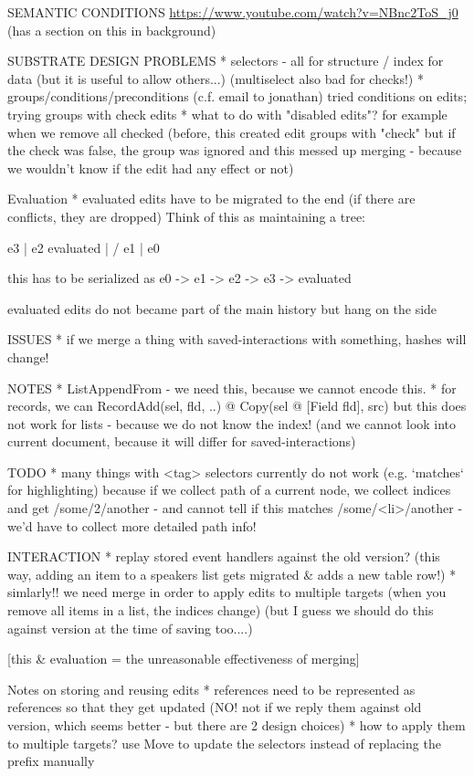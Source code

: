 \documentclass[sigconf]{acmart}
\begin{document}
SEMANTIC CONDITIONS
\url{https://www.youtube.com/watch?v=NBnc2ToS_j0}
(has a section on this in background)

SUBSTRATE DESIGN PROBLEMS
* selectors - all for structure / index for data
  (but it is useful to allow others...)
  (multiselect also bad for checks!)
* groups/conditions/preconditions
  (c.f. email to jonathan)
  tried conditions on edits; trying groups with check edits
* what to do with "disabled edits"? for example when we remove all checked
  (before, this created edit groups with "check" but if the check was false,
  the group was ignored and this messed up merging - because we wouldn't know if the
  edit had any effect or not)

Evaluation
* evaluated edits have to be migrated to the end
  (if there are conflicts, they are dropped)
  Think of this as maintaining a tree:

  e3
  |
  e2   evaluated
  |  /
  e1
  |
  e0

  this has to be serialized as e0 -> e1 -> e2 -> e3 -> evaluated

  evaluated edits do not became part of the main history
  but hang on the side

ISSUES
* if we merge a thing with saved-interactions with something, hashes will change!

NOTES
* ListAppendFrom - we need this, because we cannot encode this.
* for records, we can RecordAdd(sel, fld, ..) @ Copy(sel @ [Field fld], src) but
  this does not work for lists - because we do not know the index!
  (and we cannot look into current document, because it will differ for saved-interactions)


TODO
* many things with <tag> selectors currently do not work
  (e.g. `matches` for highlighting) because if we collect path of a current node,
  we collect indices and get /some/2/another - and cannot tell if this matches
  /some/<li>/another - we'd have to collect more detailed path info!

INTERACTION
* replay stored event handlers against the old version?
  (this way, adding an item to a speakers list gets migrated \& adds a new table row!)
* simlarly!! we need merge in order to apply edits to multiple targets
  (when you remove all items in a list, the indices change)
  (but I guess we should do this against version at the time of saving too....)

[this \& evaluation = the unreasonable effectiveness of merging]

Notes on storing and reusing edits
* references need to be represented as references so that they get updated
  (NO! not if we reply them against old version, which seems better - but there are 2 design choices)
* how to apply them to multiple targets? use Move to update the selectors instead of
  replacing the prefix manually
\end{document}
